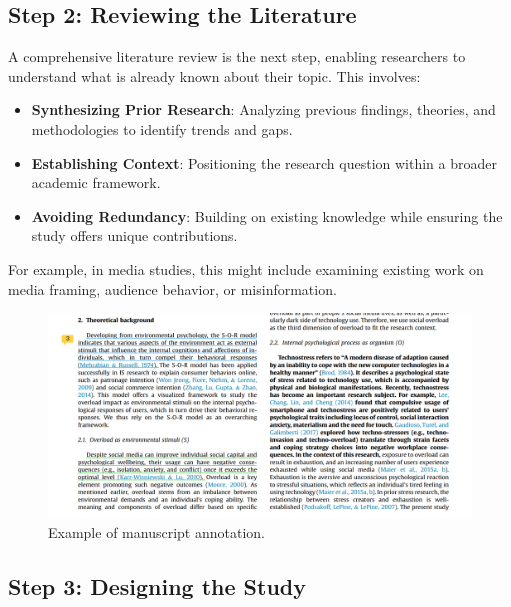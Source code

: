 \documentclass[
]{book}
\providecommand{\tightlist}{%
  \setlength{\itemsep}{0pt}\setlength{\parskip}{0pt}}
\begin{document}
\subsection*{Step 2: Reviewing the Literature}\label{step-2-reviewing-the-literature}

A comprehensive literature review is the next step, enabling researchers to understand what is already known about their topic. This involves:

\begin{itemize}
\tightlist
\item
  \textbf{Synthesizing Prior Research}: Analyzing previous findings, theories, and methodologies to identify trends and gaps.
\item
  \textbf{Establishing Context}: Positioning the research question within a broader academic framework.
\item
  \textbf{Avoiding Redundancy}: Building on existing knowledge while ensuring the study offers unique contributions.
\end{itemize}

For example, in media studies, this might include examining existing work on media framing, audience behavior, or misinformation.

\begin{figure}
\centering
\includegraphics[width=1\linewidth,height=\textheight,keepaspectratio]{images/annotated_manuscript.png}
\caption{Example of manuscript annotation.}
\end{figure}

\subsection*{Step 3: Designing the Study}\label{step-3-designing-the-study}
\end{document}
